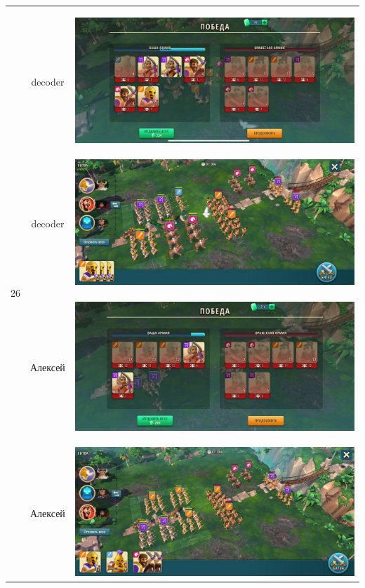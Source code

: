 \begin{longtable}{|c|c|c|}
    \hline
    \multirow{4}{*}{26} & decoder &
    \hypertarget{fight26}{\includegraphics[width=0.75\linewidth]{./parts/media/TreasureHunt/26/decoder/photo_2022-04-06_18-11-23.jpg}} \\
    & decoder &
    \includegraphics[width=0.75\linewidth]{./parts/media/TreasureHunt/26/decoder/photo_2022-04-06_18-11-14.jpg} \\
    \hline
    \multirow{4}{*}{26} & Алексей &
    \hypertarget{fight26}{\includegraphics[width=0.75\linewidth]{./parts/media/TreasureHunt/26/alexey/photo_2022-04-07_10-09-39.jpg}} \\
    & Алексей &
    \includegraphics[width=0.75\linewidth]{./parts/media/TreasureHunt/26/alexey/photo_2022-04-07_10-09-28.jpg} \\

\end{longtable}
